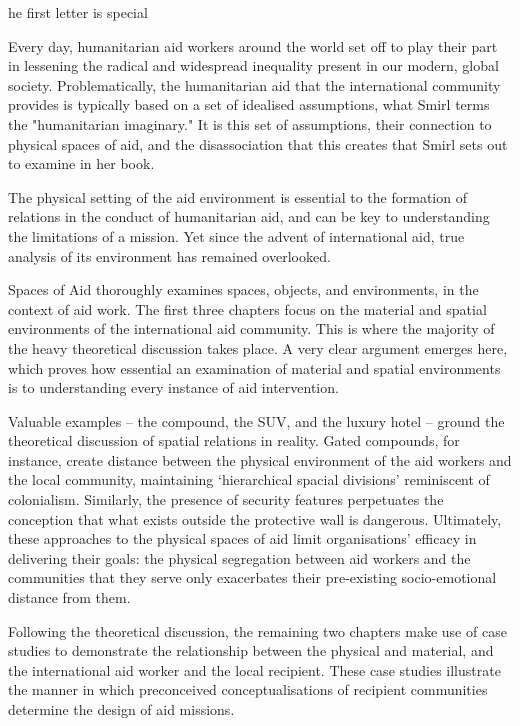 \label{ch:spaces-of-aid}

he first letter is special



   Every day, humanitarian aid workers around the world set off to play
   their part in lessening the radical and widespread inequality present
   in our modern, global society. Problematically, the humanitarian aid
   that the international community  provides is typically based on a set
   of idealised assumptions, what Smirl terms the "humanitarian
   imaginary." It is this set of assumptions, their connection to physical
   spaces of aid, and the disassociation that this creates that Smirl sets
   out to examine in her book.

   The physical setting of the aid environment is essential to the
   formation of relations in the conduct of humanitarian aid, and can be
   key to understanding the limitations of a mission. Yet since the advent
   of international aid, true analysis of its environment has remained
   overlooked.

   Spaces of Aid thoroughly examines spaces, objects, and environments, in
   the context of aid work. The first three chapters focus on the material
   and spatial environments of the international aid community. This is
   where the majority of the heavy theoretical discussion takes place. A
   very clear argument emerges here, which proves how essential an
   examination of material and spatial environments is to understanding
   every instance of aid intervention.

   Valuable examples -- the compound, the SUV, and the luxury hotel --
   ground the theoretical discussion of spatial relations in reality.
   Gated compounds, for instance, create distance between the physical
   environment of the aid workers and the local community, maintaining
   `hierarchical spacial divisions' reminiscent of colonialism. Similarly,
   the presence of security features perpetuates the conception that what
   exists outside the protective wall is dangerous. Ultimately, these
   approaches to the physical spaces of aid limit organisations' efficacy
   in delivering their goals: the physical segregation between aid workers
   and the communities that they serve only exacerbates their pre-existing
   socio-emotional distance from them.

   Following the theoretical discussion, the remaining two chapters make
   use of case studies to demonstrate the relationship between the
   physical and material, and the international aid worker and the local
   recipient. These case studies illustrate the manner in which
   preconceived conceptualisations of recipient communities determine the
   design of aid missions.

